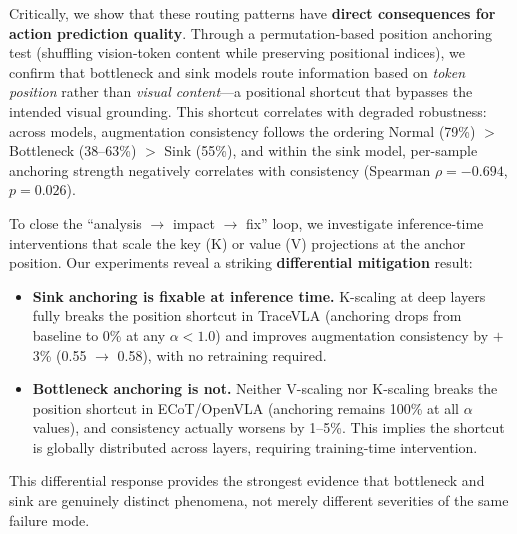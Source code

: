 Critically, we show that these routing patterns have \textbf{direct consequences for action prediction quality}.
Through a permutation-based position anchoring test (shuffling vision-token content while preserving positional indices), we confirm that bottleneck and sink models route information based on \emph{token position} rather than \emph{visual content}---a positional shortcut that bypasses the intended visual grounding.
This shortcut correlates with degraded robustness: across models, augmentation consistency follows the ordering Normal (79\%) $>$ Bottleneck (38--63\%) $>$ Sink (55\%), and within the sink model, per-sample anchoring strength negatively correlates with consistency (Spearman $\rho = -0.694$, $p = 0.026$).

To close the ``analysis $\to$ impact $\to$ fix'' loop, we investigate inference-time interventions that scale the key (K) or value (V) projections at the anchor position.
Our experiments reveal a striking \textbf{differential mitigation} result:
\begin{itemize}[leftmargin=*,nosep]
    \item \textbf{Sink anchoring is fixable at inference time.} K-scaling at deep layers fully breaks the position shortcut in TraceVLA (anchoring drops from baseline to 0\% at any $\alpha < 1.0$) and improves augmentation consistency by $+$3\% (0.55 $\to$ 0.58), with no retraining required.
    \item \textbf{Bottleneck anchoring is not.} Neither V-scaling nor K-scaling breaks the position shortcut in ECoT/OpenVLA (anchoring remains 100\% at all $\alpha$ values), and consistency actually worsens by 1--5\%. This implies the shortcut is globally distributed across layers, requiring training-time intervention.
\end{itemize}
This differential response provides the strongest evidence that bottleneck and sink are genuinely distinct phenomena, not merely different severities of the same failure mode.

